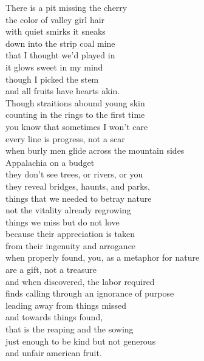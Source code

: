 There is a pit missing the cherry\\
the color of valley girl hair\\
with quiet smirks it sneaks\\
down into the strip coal mine\\
that I thought we'd played in\\
it glows sweet in my mind\\
though I picked the stem\\
and all fruits have hearts akin.\\
\newline
Though straitions abound young skin\\
counting in the rings to the first time\\
you know that sometimes I won't care\\
every line is progress, not a scar\\
when burly men glide across the mountain sides\\
Appalachia on a budget\\
they don't see trees, or rivers, or you\\
they reveal bridges, haunts, and parks,\\
things that we needed to betray nature\\
not the vitality already regrowing\\
things we miss but do not love\\
\newline
because their appreciation is taken\\
from their ingenuity and arrogance\\
when properly found, you, as a metaphor for nature\\
are a gift, not a treasure\\
and when discovered, the labor required\\
finds calling through an ignorance of purpose\\
leading away from things missed\\
and towards things found,\\
that is the reaping and the sowing\\
just enough to be kind but not generous\\
and unfair american fruit.\\

